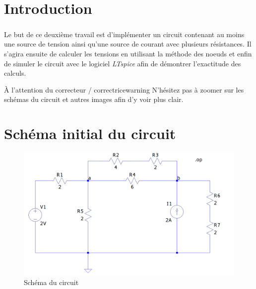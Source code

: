 \section{Introduction}

    \subparagraph{}Le but de ce {\color{info}deuxième travail} est d'implémenter un circuit contenant au moins une source de tension ainsi qu'une source de courant avec 
    plusieurs résistances. Il s'agira ensuite de calculer les tensions en utilisant la méthode des noeuds et enfin de simuler le circuit avec le logiciel \textit{LTspice}
    afin de démontrer l'exactitude des calculs.\\[1.5cm]
    
    \begin{titletbox}{À l'attention du correcteur / correctrice}{warning}
        N'hésitez pas à zoomer sur les schémas du circuit et autres images afin d'y voir plus clair.
    \end{titletbox}

\section{Schéma initial du circuit}

    \begin{figure}[H]
        \centering
        \includegraphics[scale=0.5]{../pictures/circuit.png} %
        \caption{Schéma du circuit}
    \end{figure}

